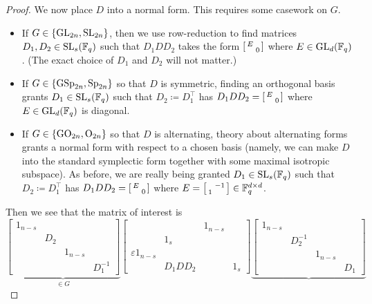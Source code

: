 \begin{proof}
	We now place $D$ into a normal form. This requires some casework on $G$.
	\begin{itemize}
		\item If $G\in\{\mathrm{GL}_{2n},\mathrm{SL}_{2n}\}$, then we use row-reduction to find matrices $D_1,D_2\in\mathrm{SL}_{s}(\mathbb F_q)$ such that $D_1DD_2$ takes the form $\begin{bsmallmatrix}
			E \\ & 0
		\end{bsmallmatrix}$ where $E\in\mathrm{GL}_d(\mathbb F_q)$. (The exact choice of $D_1$ and $D_2$ will not matter.)
		\item If $G\in\{\mathrm{GSp}_{2n},\mathrm{Sp}_{2n}\}$ so that $D$ is symmetric, finding an orthogonal basis grants $D_1\in\mathrm{SL}_s(\mathbb F_q)$ such that $D_2\coloneqq D_1^\intercal$ has $D_1DD_2=\begin{bsmallmatrix}
			E \\ & 0
		\end{bsmallmatrix}$ where $E\in\mathrm{GL}_d(\mathbb F_q)$ is diagonal.
		\item If $G\in\{\mathrm{GO}_{2n},\mathrm{O}_{2n}\}$ so that $D$ is alternating, theory about alternating forms grants a normal form with respect to a chosen basis (namely, we can make $D$ into the standard symplectic form together with some maximal isotropic subspace). As before, we are really being granted $D_1\in\mathrm{SL}_s(\mathbb F_q)$ such that $D_2\coloneqq D_1^\intercal$ has $D_1DD_2=\begin{bsmallmatrix}
			E \\ & 0
		\end{bsmallmatrix}$ where $E=\begin{bsmallmatrix}
			& -1 \\ 1
		\end{bsmallmatrix}\in\mathbb F_q^{d\times d}$.
	\end{itemize}
	Then we see that the matrix of interest is
	\[\underbrace{\begin{bmatrix}
		1_{n-s} \\ & D_2 \\ && 1_{n-s} \\ &&& D_1^{-1}
	\end{bmatrix}}_{\in G}\begin{bmatrix}
		&& 1_{n-s} \\ & 1_s \\
		\varepsilon1_{n-s} &   &   \\ & D_1DD_2 &   & 1_s
	\end{bmatrix}\underbrace{\begin{bmatrix}
		1_{n-s} \\ & D_2^{-1} \\ && 1_{n-s} \\ &&& D_1

\end{bmatrix}}\]
\end{proof}
